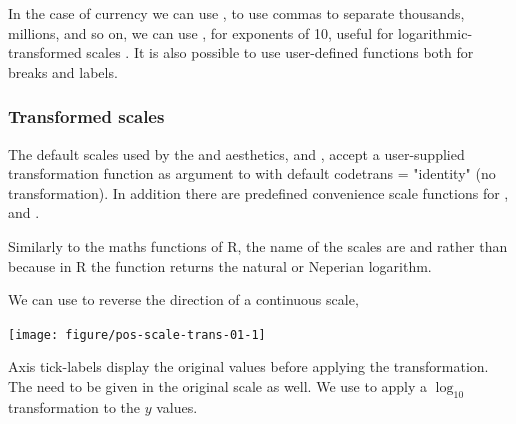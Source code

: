 \documentclass[krantz2]{krantz}\usepackage{knitr}%
\begin{document}
In the case of currency we can use , to use commas to separate thousands, millions, and so on, we can use , for exponents of 10, useful for logarithmic-transformed scales . It is also possible to use user-defined functions both for breaks and labels.

\subsubsection{Transformed scales}\label{sec:plot:scales:trans}

The default scales used by the  and  aesthetics,  and , accept a user-supplied transformation function as argument to  with default code{trans = "identity"} (no transformation). In addition there are predefined convenience scale functions for ,  and .

\begin{warningbox}
  Similarly to the maths functions of R, the name of the scales are  and  rather than  because in R the function  returns the natural or Neperian logarithm.
\end{warningbox}

We can use  to reverse the direction of a continuous scale,

\begin{knitrout}\footnotesize
{}\color{fgcolor}\begin{kframe}
\begin{alltt}
  \hlopt{+}
  \hlstd{()} \hlopt{+}
  \hlstd{()}
\end{alltt}
\end{kframe}

{\centering \texttt{[image: figure/pos-scale-trans-01-1]} 

}



\end{knitrout}

Axis tick-labels display the original values before applying the transformation. The  need to be given in the original scale as well. We use  to apply a $\log_{10}$ transformation to the $y$ values.
\end{document}
